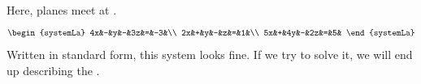 Here, \makeblank[1.5in] planes meet at \makeblank. 
\[\begin{systemLa}
4x&-&y&-&3z&=&-3&\\
2x&+&y&-&z&=&1&\\
5x&+&4y&-&2z&=&5&
\end{systemLa}\]
Written in standard form, this system looks fine. If we try to solve it, we will end up describing the \makeblank[1in]. %
